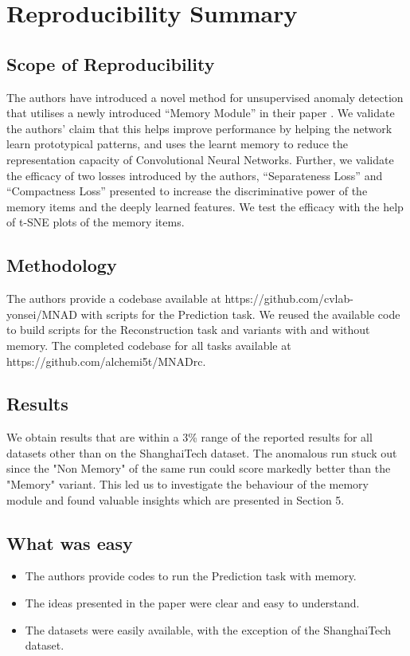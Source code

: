 \section*{\centering Reproducibility Summary}

\subsection*{Scope of Reproducibility}
 The authors have introduced a novel method for unsupervised anomaly detection that utilises a newly introduced “Memory Module” in their paper \cite{park2020learning}. We validate the authors' claim that this helps improve performance by helping the network learn prototypical patterns, and uses the learnt memory to reduce the representation capacity of Convolutional Neural Networks. Further, we validate the efficacy of two losses introduced by the authors, “Separateness Loss” and “Compactness Loss” presented to increase the discriminative power of the memory items and the deeply learned features.  We test the efficacy with the help of t-SNE plots of the memory items. 


\subsection*{Methodology}
The authors provide a codebase available at https://github.com/cvlab-yonsei/MNAD with scripts for the Prediction task. We reused the available code to build scripts for the Reconstruction task and variants with and without memory. The completed codebase for all tasks available at https://github.com/alchemi5t/MNADrc.
\subsection*{Results}
We obtain results that are within a 3\% range of the reported results for all datasets other than on the ShanghaiTech dataset\cite{Luo2017ARO}. The anomalous run stuck out since the "Non Memory" of the same run could score markedly better than the "Memory" variant. This led us to investigate the behaviour of the memory module and found valuable insights which are presented in Section 5. 

\subsection*{What was easy}

\begin{itemize}
    \item The authors provide codes to run the Prediction task with memory. 
    \item The ideas presented in the paper were clear and easy to understand.
    \item The datasets were easily available, with the exception of the ShanghaiTech  dataset\cite{Luo2017ARO}.
\end{itemize}

